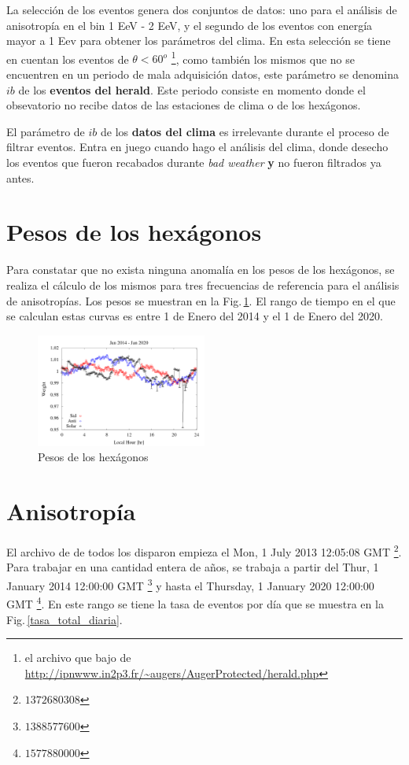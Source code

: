 
La selección de los eventos genera dos conjuntos de datos: uno para el análisis de anisotropía en el bin 1 EeV - 2 EeV, y el segundo de los eventos con energía mayor a 1 Eev para obtener los parámetros del clima. En esta selección se tiene en cuentan los eventos de $\theta < 60^o$ \footnote{el archivo que bajo de \url{http://ipnwww.in2p3.fr/~augers/AugerProtected/herald.php} }, como también  los mismos que no se encuentren en un periodo de mala adquisición datos, este parámetro se denomina $ib$ de los \textbf{eventos del herald}. Este periodo consiste en momento donde el obsevatorio no recibe datos de las estaciones de clima o de los hexágonos. 

El parámetro de $ib$ de los \textbf{datos del clima} es irrelevante durante el proceso de filtrar eventos. Entra en juego cuando hago el análisis del clima, donde desecho los eventos que fueron recabados durante \emph{bad weather} \textbf{y} no fueron filtrados ya antes. 


\section{Pesos de los hexágonos}

Para constatar que no exista ninguna anomalía en los pesos de los hexágonos, se realiza el cálculo de los mismos para tres frecuencias de referencia para el análisis de anisotropías.  Los pesos se muestran en la Fig.\,\ref{fig:wei_14_20}. El rango de tiempo en el que se calculan estas curvas es entre 1 de Enero del 2014 y el 1 de Enero del 2020.

\begin{figure}[H]
	\centering
	\includegraphics[width=0.5\textwidth]{weigth2014-2020_jan.png} 	
	\caption{Pesos de los hexágonos}
	\label{fig:wei_14_20}
\end{figure}

\section{Anisotropía}
El archivo de de todos los disparon empieza el Mon, 1 July 2013 12:05:08 GMT \footnote{$1372680308$}. Para trabajar en una cantidad entera de años, se trabaja a partir del  Thur, 1 January 2014 12:00:00 GMT \footnote{$1388577600$} y hasta el Thursday, 1 January 2020 12:00:00 GMT \footnote{$1577880000$}.  En este rango se tiene la tasa de eventos por día que se muestra en la Fig.\,\ref{tasa_total_diaria}.


